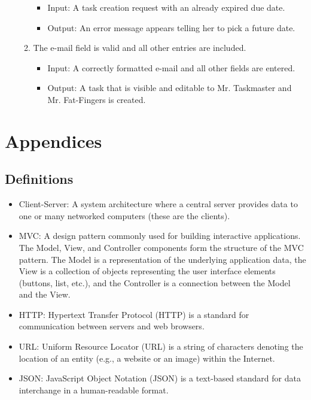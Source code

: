 \documentclass{article}
\begin{document}
\begin{enumerate}
\begin{enumerate}
            \begin{itemize}
                \item Input: A task creation request with an already expired due date.
                \item Output: An error message appears telling her to pick a future date.
            \end{itemize}
        \item The e-mail field is valid and all other entries are included.
            \begin{itemize}
                \item Input: A correctly formatted e-mail and all other fields are entered.
                \item Output: A task that is visible and editable to Mr. Taskmaster and Mr. Fat-Fingers is created. 
            \end{itemize}
    \end{enumerate}   
\end{enumerate}


\newpage
\section{Appendices}
\subsection{Definitions}
\begin{itemize}
\item Client-Server: A system architecture where a central server provides data to one or many networked computers (these are the clients).
\item MVC: A design pattern commonly used for building interactive applications. The Model, View, and Controller components form the structure of the MVC pattern. The Model is a representation of  the underlying application data, the  View is a collection of objects representing the user interface elements (buttons, list, etc.), and the Controller is a connection between the Model and the View.
\item HTTP: Hypertext Transfer Protocol (HTTP) is a standard for communication between servers and web browsers.
\item URL: Uniform Resource Locator (URL) is a string of characters denoting the location of an entity (e.g., a website or an image) within the Internet.
\item JSON: JavaScript Object Notation (JSON) is a text-based standard for data interchange in a human-readable format.
\end{itemize}
\end{document}
